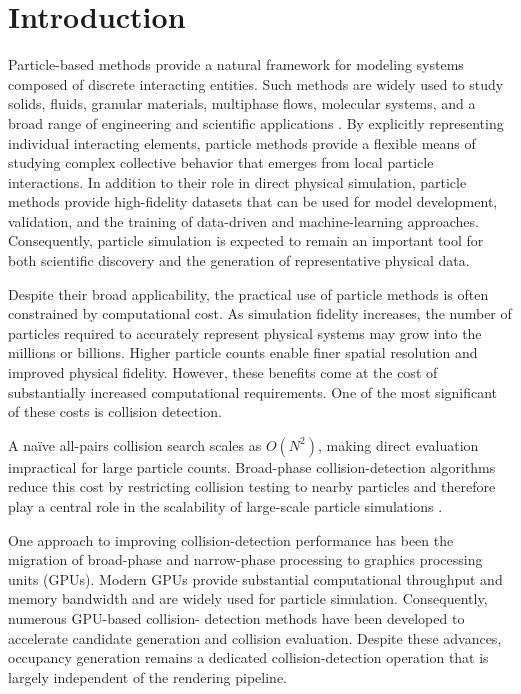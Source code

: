 
\section{Introduction}

Particle-based methods provide a natural framework for modeling systems
composed of discrete interacting entities. Such methods are widely used
to study solids, fluids, granular materials, multiphase flows, molecular
systems, and a broad range of engineering and scientific applications
\cite{Meakin2009,onate2011,allen2017}. By explicitly representing
individual interacting elements, particle methods provide a flexible
means of studying complex collective behavior that emerges from local
particle interactions. In addition to their role in direct physical
simulation, particle methods provide high-fidelity datasets that can be
used for model development, validation, and the training of
data-driven and machine-learning approaches. Consequently, particle
simulation is expected to remain an important tool for both scientific
discovery and the generation of representative physical data.

Despite their broad applicability, the practical use of particle
methods is often constrained by computational cost. As simulation
fidelity increases, the number of particles required to accurately
represent physical systems may grow into the millions or billions.
Higher particle counts enable finer spatial resolution and improved
physical fidelity. However, these benefits come at the cost of
substantially increased computational requirements. One of the most
significant of these costs is collision detection.

A naïve all-pairs collision search scales as \(O(N^2)\), making direct
evaluation impractical for large particle counts. Broad-phase
collision-detection algorithms reduce this cost by restricting collision
testing to nearby particles and therefore play a central role in the
scalability of large-scale particle simulations \cite{ericson2004}.

One approach to improving collision-detection performance has been the
migration of broad-phase and narrow-phase processing to graphics
processing units (GPUs). Modern GPUs provide substantial computational
throughput and memory bandwidth and are widely used for 
particle simulation. Consequently, numerous GPU-based collision-
detection methods have been developed to accelerate candidate
generation and collision evaluation. Despite these advances,
occupancy generation remains a dedicated collision-detection operation
that is largely independent of the rendering pipeline.

